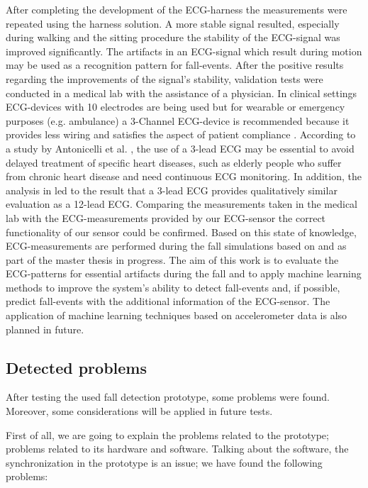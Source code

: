 \documentclass[review]{elsarticle}
\begin{document}
After completing the development of the ECG-harness the measurements were repeated using the harness solution. A more stable signal resulted, especially during walking and the sitting procedure the stability of the ECG-signal was improved significantly. The artifacts in an ECG-signal which result during motion may be used as a recognition pattern for fall-events. After the positive results regarding the improvements of the signal's stability, validation tests were conducted in a medical lab with the assistance of a physician. In clinical settings ECG-devices with 10 electrodes are being used but for wearable or emergency purposes (e.g. ambulance) a 3-Channel ECG-device is recommended because it provides less wiring and satisfies the aspect of patient compliance \cite{DrNicoletteWagner}. According to a study by Antonicelli et al. \cite{Antonicelli-ECG}, the use of a 3-lead ECG may be essential to avoid delayed treatment of specific heart diseases, such as elderly people who suffer from chronic heart disease and need continuous ECG monitoring. In addition, the analysis in \cite{Antonicelli-ECG} led to the result that a 3-lead ECG provides qualitatively similar evaluation as a 12-lead ECG. Comparing the measurements taken in the medical lab with the ECG-measurements provided by our ECG-sensor the correct functionality of our sensor could be confirmed. Based on this state of knowledge, ECG-measurements are performed during the fall simulations based on \cite{Li2009} and \cite{Pannurat2014} as part of the master thesis \cite{FatimaMasterThesis} in progress. The aim of this work is to evaluate the ECG-patterns for essential artifacts during the fall and to apply machine learning methods to improve the system's ability to detect fall-events and, if possible, predict fall-events with the additional information of the ECG-sensor. The application of machine learning techniques based on accelerometer data is also planned in future. 

\subsection{Detected problems}
\label{sub:detectedproblems}

After testing the used fall detection prototype, some problems were 
found. Moreover, some considerations will be applied in future tests.

First of all, we are going to explain the problems related to the prototype; problems related to its hardware and
software. Talking about the software, the synchronization in the prototype is an issue; we have found the following problems:
\end{document}
